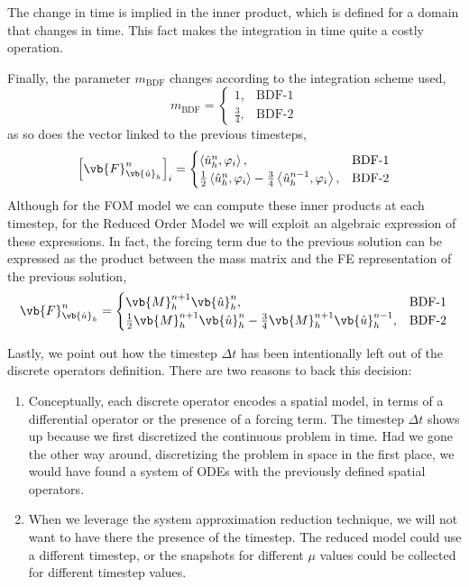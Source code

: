 \documentclass[../main.tex]{subfiles}
\newcommand{\inner}[2]{\left<#1, #2\right>}
\begin{document}
The change in time is implied in the inner product, which is defined for a domain that changes in time. 
This fact makes the integration in time quite a costly operation.

Finally, the parameter $m_{\text{BDF}}$ changes according to the integration scheme used,
\begin{equation}
    m_{\text{BDF}} = 
    \begin{cases}
    1, &\text{BDF-1} \\    
    \frac{3}{4}, &\text{BDF-2}    
    \end{cases}
\end{equation}
as so does the vector linked to the previous timesteps, 
\begin{equation}
    \left[\vb{F}_{\vb{\hat{u}}_h}^{n}\right]_{i} = 
    \begin{cases}
        \inner{\hat{u}_h^{n}}{\varphi_i}, &\text{BDF-1} \\
        \frac{1}{2}\inner{\hat{u}_h^{n}}{\varphi_i}
        - \frac{3}{4}\inner{\hat{u}_h^{n-1}}{\varphi_i}, &\text{BDF-2}
    \end{cases}
\end{equation}
Although for the FOM model we can compute these inner products at each timestep, for the Reduced Order Model we will exploit an algebraic expression of these expressions.
In fact, the forcing term due to the previous solution can be expressed as the product between the mass matrix and the FE representation of the previous solution, 
\begin{equation}
    \label{eq:1d_fom_forcing_term_time_mass_matrix}
    \vb{F}_{\vb{\hat{u}}_h}^{n}= 
    \begin{cases}
        \vb{M}_{h}^{n+1} \vb{\hat{u}}_{h}^{n}, &\text{BDF-1} \\
        \frac{1}{2}\vb{M}_{h}^{n+1} \vb{\hat{u}}_{h}^{n}
        - \frac{3}{4}\vb{M}_{h}^{n+1} \vb{\hat{u}}_{h}^{n-1}, &\text{BDF-2}
    \end{cases}
\end{equation}

Lastly, we point out how the timestep $\Delta t$ has been intentionally left out of the discrete operators definition.
There are two reasons to back this decision:
\begin{enumerate}
    \item Conceptually, each discrete operator encodes a spatial model, in terms of a differential operator or the presence of a forcing term.
    The timestep $\Delta t$ shows up because we first discretized the continuous problem in time. 
    Had we gone the other way around, discretizing the problem in space in the first place, we would have found a system of ODEs with the previously defined spatial operators. 
    \item When we leverage the system approximation reduction technique, we will not want to have there the presence of the timestep.
    The reduced model could use a different timestep, or the snapshots for different $\mu$ values could be collected for different timestep values.
\end{enumerate} 
\end{document}
